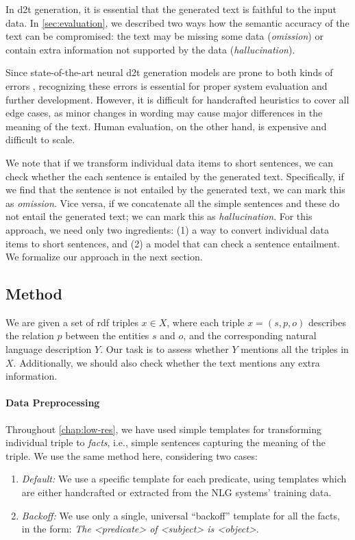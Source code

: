 In \ac{d2t} generation, it is essential that the generated text is faithful to the input data. In \autoref{sec:evaluation}, we described two ways how the semantic accuracy of the text can be compromised: the text may be missing some data (\emph{omission}) or contain extra information not supported by the data (\emph{hallucination}).

Since state-of-the-art neural \ac{d2t} generation models are prone to both kinds of errors \cite{gehrmannEndtoEndContentPlan2018,ferreiraNeuralDatatotextGeneration2019,dusekEvaluatingStateoftheartEndtoEnd2020}, recognizing these errors is essential for proper system evaluation and further development. However, it is difficult for handcrafted heuristics to cover all edge cases, as minor changes in wording may cause major differences in the meaning of the text. Human evaluation, on the other hand, is expensive and difficult to scale.

We note that if we transform individual data items to short sentences, we can check whether the each sentence is entailed by the generated text. Specifically, if we find that the sentence is not entailed by the generated text, we can mark this as \emph{omission}. Vice versa, if we concatenate all the simple sentences and these do not entail the generated text; we can mark this as \emph{hallucination}. For this approach, we need only two ingredients: (1) a way to convert individual data items to short sentences, and (2) a model that can check a sentence entailment. We formalize our approach in the next section.



\subsection{Method}
\label{sec:sem-acc:method}
We are given a set of \acs{rdf} triples $x \in X$, where each triple $x = (s, p, o)$ describes the relation $p$ between the entities $s$ and $o$, and the corresponding natural language description $Y$. Our task is to assess whether $Y$ mentions all the triples in $X$. Additionally, we should also check whether the text mentions any extra information.

\paragraph{Data Preprocessing} Throughout \autoref{chap:low-res}, we have used simple templates for transforming individual triple to \emph{facts}, i.e., simple sentences capturing the meaning of the triple.  We use the same method here, considering two cases:
\begin{enumerate}
    \item \emph{Default:} We use a specific template for each predicate, using templates which are either handcrafted or extracted from the NLG systems' training data.
    \item \emph{Backoff:} We use only a single, universal ``backoff'' template for all the facts, in the form: \emph{The \textless{}predicate\textgreater{} of \textless{}subject\textgreater{} is \textless{}object\textgreater{}}.
\end{enumerate}


